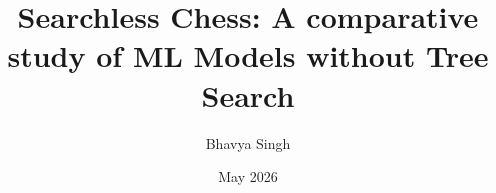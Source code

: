 \documentclass{surreydissertation}
\title{Searchless Chess: A comparative study of ML Models without Tree Search}
\author{Bhavya Singh}
\date{May 2026}
\begin{document}
\maketitle



\tableofcontents
\listoffigures
\listoftables












\appendix



%
\nocite{*}


\end{document}
